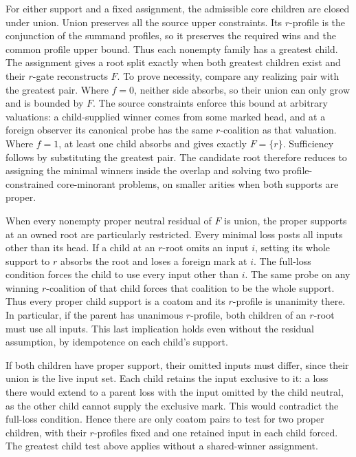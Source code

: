 For either support and a fixed assignment, the
admissible core children are closed under union.
Union preserves all the source upper constraints.
Its $r$-profile is the conjunction of the summand
profiles, so it preserves the required wins and
the common profile upper bound. Thus each nonempty
family has a greatest child. The assignment gives a root split
exactly when both greatest children exist and
their $r$-gate reconstructs $F$. To prove
necessity, compare any realizing pair with the
greatest pair. Where $f=0$, neither side absorbs,
so their union can only grow and is bounded by
$F$. The source constraints enforce this bound
at arbitrary valuations: a child-supplied winner
comes from some marked head, and at a foreign
observer its canonical probe has the same
$r$-coalition as that valuation. Where $f=1$,
at least one child absorbs and gives exactly
$F=\{r\}$. Sufficiency follows by substituting
the greatest pair. The candidate root therefore
reduces to assigning the minimal winners inside
the overlap and solving two profile-constrained
core-minorant problems, on smaller arities when
both supports are proper.

When every nonempty proper neutral residual of $F$
is union, the proper supports at an owned root are
particularly restricted. Every minimal loss posts
all inputs other than its head. If a child at an
$r$-root omits an input $i$, setting its whole
support to $r$ absorbs the root and loses a foreign
mark at $i$. The full-loss condition forces the
child to use every input other than $i$. The same
probe on any winning $r$-coalition of that child
forces that coalition to be the whole support.
Thus every proper child support is a coatom and
its $r$-profile is unanimity there. In particular,
if the parent has unanimous $r$-profile, both
children of an $r$-root must use all inputs. This
last implication holds even without the residual
assumption, by idempotence on each child's support.

If both children have proper support, their omitted
inputs must differ, since their union is the live
input set. Each child retains the input exclusive
to it: a loss there would extend to a parent loss
with the input omitted by the child neutral, as the
other child cannot supply the exclusive mark. This
would contradict the full-loss condition. Hence
there are only coatom pairs to test for two proper
children, with their $r$-profiles fixed and one
retained input in each child forced. The greatest
child test above applies without a shared-winner
assignment.


